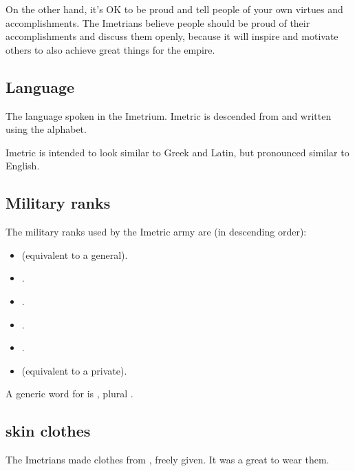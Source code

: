 On the other hand, it's OK to be proud and tell people of your own virtues and accomplishments. 
The Imetrians believe people should be proud of their accomplishments and discuss them openly, because it will inspire and motivate others to also achieve great things for the empire. 





\subsection{Language}
The language spoken in the Imetrium. 
Imetric is descended from  and written using the \Ortaican{} alphabet. 

Imetric is intended to look similar to Greek and Latin, but pronounced similar to English. 





\subsection{Military ranks}
The military ranks used by the Imetric army are (in descending order): 

\begin{itemize}
  \item \Deccor{} (equivalent to a general). 
  \item \Retaxis{}. 
  \item \Salican{}. 
  \item \Vexstra{}. 
  \item \Corphin{}. 
  \item \Inclan{} (equivalent to a private). 
\end{itemize}



A generic word for  is \Rengos, plural \Rengoi. 









\subsection{\Naga skin clothes}
The Imetrians made clothes from , freely given. 
It was a great \honour to wear them. 

